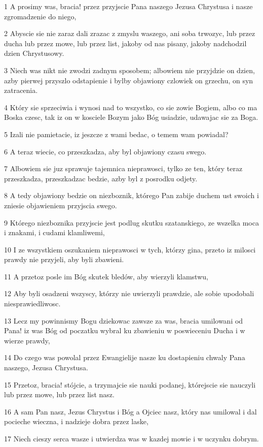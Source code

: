 \par 1 A prosimy was, bracia! przez przyjscie Pana naszego Jezusa Chrystusa i nasze zgromadzenie do niego,
\par 2 Abyscie sie nie zaraz dali zrazac z zmyslu waszego, ani soba trwozyc, lub przez ducha lub przez mowe, lub przez list, jakoby od nas pisany, jakoby nadchodzil dzien Chrystusowy.
\par 3 Niech was nikt nie zwodzi zadnym sposobem; albowiem nie przyjdzie on dzien, azby pierwej przyszlo odstapienie i bylby objawiony czlowiek on grzechu, on syn zatracenia.
\par 4 Który sie sprzeciwia i wynosi nad to wszystko, co sie zowie Bogiem, albo co ma Boska czesc, tak iz on w kosciele Bozym jako Bóg usiadzie, udawajac sie za Boga.
\par 5 Izali nie pamietacie, iz jeszcze z wami bedac, o temem wam powiadal?
\par 6 A teraz wiecie, co przeszkadza, aby byl objawiony czasu swego.
\par 7 Albowiem sie juz sprawuje tajemnica nieprawosci, tylko ze ten, który teraz przeszkadza, przeszkadzac bedzie, azby byl z posrodku odjety.
\par 8 A tedy objawiony bedzie on niezboznik, którego Pan zabije duchem ust swoich i zniesie objawieniem przyjscia swego.
\par 9 Którego niezboznika przyjscie jest podlug skutku szatanskiego, ze wszelka moca i znakami, i cudami klamliwemi,
\par 10 I ze wszystkiem oszukaniem nieprawosci w tych, którzy gina, przeto iz milosci prawdy nie przyjeli, aby byli zbawieni.
\par 11 A przetoz posle im Bóg skutek bledów, aby wierzyli klamstwu,
\par 12 Aby byli osadzeni wszyscy, którzy nie uwierzyli prawdzie, ale sobie upodobali niesprawiedliwosc.
\par 13 Lecz my powinnismy Bogu dziekowac zawsze za was, bracia umilowani od Pana! iz was Bóg od poczatku wybral ku zbawieniu w poswieceniu Ducha i w wierze prawdy,
\par 14 Do czego was powolal przez Ewangielije nasze ku dostapieniu chwaly Pana naszego, Jezusa Chrystusa.
\par 15 Przetoz, bracia! stójcie, a trzymajcie sie nauki podanej, którejscie sie nauczyli lub przez mowe, lub przez list nasz.
\par 16 A sam Pan nasz, Jezus Chrystus i Bóg a Ojciec nasz, który nas umilowal i dal pocieche wieczna, i nadzieje dobra przez laske,
\par 17 Niech cieszy serca wasze i utwierdza was w kazdej mowie i w uczynku dobrym.

